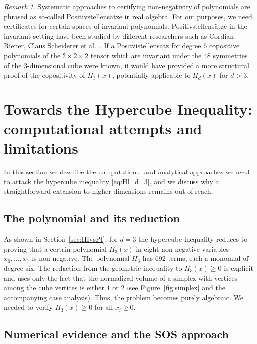 \documentclass[11pt]{amsart}
\newcommand{\Ivan}[1]{\todo[size=\tiny,inline,color=green!30]{#1 \\ \hfill --- Vanya}}
\theoremstyle{definition}
\theoremstyle{remark}
\newtheorem{rmk}[thm]{Remark}
\begin{document}
\begin{rmk} 
	Systematic approaches to certifying non-negativity of polynomials are phrased as so-called Positivstellensätze in real algebra. For our purposes, we need certificates for certain spaces of invariant polynomials. Positivstellensätze in the invariant setting have been studied by different researchers such as Cordian Riener, Claus Scheiderer et al.~\cite{DR,HMR,Schei}. %
    If a Positvistellensatz for degree $6$ copositive polynomials of the $2 \times 2 \times 2$ tensor which are invariant under the $48$ symmetries of the $3$-dimensional cube were known, %
it would have provided a more structural proof of the copositivity of $H_3(x)$, potentially applicable to $H_d(x)$ for $d>3$.  %
	\end{rmk} 


%

%

\section{Towards the Hypercube Inequality: \\ computational attempts and limitations}

In this section we describe the computational and analytical approaches we used to attack the hypercube inequality \eqref{eq:HI_d=3}, and we discuss why a straightforward extension to higher dimensions remains out of reach.

\subsection{The polynomial and its reduction}

As shown in Section~\ref{sec:HIvsPI}, for $d=3$ the hypercube inequality reduces to proving that a certain polynomial $H_3(x)$ in eight non‑negative variables $x_0,\dots,x_7$ is non‑negative. The polynomial $H_3$ has 692 terms, each a monomial of degree six. The reduction from the geometric inequality to $H_3(x)\ge 0$ is explicit and uses only the fact that the normalized volume of a simplex with vertices among the cube vertices is either $1$ or $2$ (see Figure~\ref{fig:simplex} and the accompanying case analysis). Thus, the problem becomes purely algebraic. We needed to verify $H_3(x)\ge 0$ for all $x_i\ge 0$.

\subsection{Numerical evidence and the SOS approach}
\end{document}
